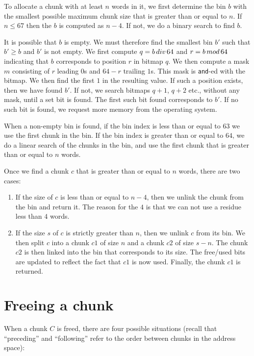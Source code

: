 To allocate a chunk with at least $n$ words in it, we first determine
the bin $b$ with the smallest possible maximum chunk size that is
greater than or equal to $n$.  If $n \le 67$ then the $b$ is computed
as $n-4$.  If not, we do a binary search to find $b$.

It is possible that $b$ is empty.  We must therefore find the smallest
bin $b'$ such that $b' \ge b$ and $b'$ is not empty.  We first compute
$q = b \thinspace div \thinspace 64$ and $r = b \thinspace
mod \thinspace 64$ indicating that $b$ corresponds to position $r$ in
bitmap $q$.  We then compute a mask $m$ consisting of $r$ leading $0$s
and $64-r$ trailing $1$s.  This mask is \texttt{and}-ed with the bitmap.  We
then find the first $1$ in the resulting value.  If such a position
exists, then we have found $b'$.  If not, we search bitmaps $q+1$,
$q+2$ etc., without any mask, until a set bit is found.  The first
such bit found corresponds to $b'$.  If no such bit is found, we
request more memory from the operating system.

When a non-empty bin is found, if the bin index is less than or equal
to $63$ we use the first chunk in the bin.  If the bin index is
greater than or equal to $64$, we do a linear search of the chunks in
the bin, and use the first chunk that is greater than or equal to $n$
words.

Once we find a chunk $c$ that is greater than or equal to $n$ words,
there are two cases:

\begin{enumerate}
\item If the size of $c$ is less than or equal to $n-4$, then we
  unlink the chunk from the bin and return it.  The reason for the $4$
  is that we can not use a residue less than $4$ words.
\item If the size $s$ of $c$ is strictly greater than $n$, then we
  unlink $c$ from its bin.  We then split $c$ into a chunk $c1$ of
  size $n$ and a chunk $c2$ of size $s-n$.  The chunk $c2$ is then
  linked into the bin that corresponds to its size.  The free/used
  bits are updated to reflect the fact that $c1$ is now used.
  Finally, the chunk $c1$ is returned.
\end{enumerate}

\section{Freeing a chunk}

When a chunk $C$ is freed, there are four possible situations (recall
that ``preceding'' and ``following'' refer to the order between chunks
in the address space):


